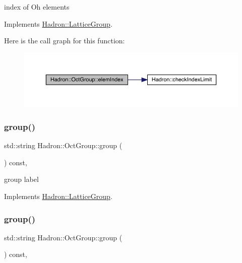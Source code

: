 index of Oh elements 

Implements \mbox{\hyperlink{structHadron_1_1LatticeGroup_afb8e3ee60de059f75bce1044c694e1e8}{Hadron\+::\+Lattice\+Group}}.

Here is the call graph for this function\+:
\nopagebreak
\begin{figure}[H]
\begin{center}
\leavevmode
\includegraphics[width=350pt]{d1/de5/structHadron_1_1OctGroup_a1410a74894e1d12337548245c4e6fd47_cgraph}
\end{center}
\end{figure}
\mbox{\label{structHadron_1_1OctGroup_a0d21b9bbc5cc2cafa4945e9dd5608a6b}} 
\subsubsection{\texorpdfstring{group()}{group()}\hspace{0.1cm}{\footnotesize\ttfamily [1/2]}}
{\footnotesize\ttfamily std\+::string Hadron\+::\+Oct\+Group\+::group (\begin{DoxyParamCaption}{ }\end{DoxyParamCaption}) const\hspace{0.3cm}{\ttfamily [inline]}, {\ttfamily [virtual]}}

group label 

Implements \mbox{\hyperlink{structHadron_1_1LatticeGroup_a82208a322bf1b1db489f16af38e70087}{Hadron\+::\+Lattice\+Group}}.

\mbox{\label{structHadron_1_1OctGroup_a0d21b9bbc5cc2cafa4945e9dd5608a6b}} 
\subsubsection{\texorpdfstring{group()}{group()}\hspace{0.1cm}{\footnotesize\ttfamily [2/2]}}
{\footnotesize\ttfamily std\+::string Hadron\+::\+Oct\+Group\+::group (\begin{DoxyParamCaption}{ }\end{DoxyParamCaption}) const\hspace{0.3cm}{\ttfamily [inline]}, {\ttfamily [virtual]}}

